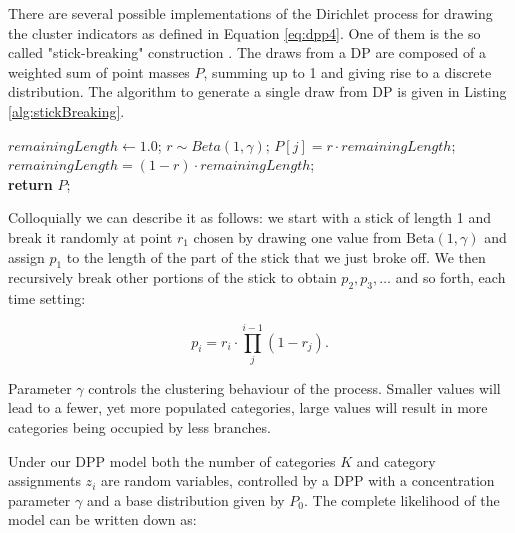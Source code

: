 There are several possible implementations of the Dirichlet process for drawing the cluster indicators as defined in Equation \ref{eq:dpp4}. 
One of them is the so called "stick-breaking" construction \citep{Sethuraman94}.
The draws from a DP are composed of a weighted sum of point masses $P$, summing up to 1 and giving rise to a discrete distribution.
The algorithm to generate a single draw from DP is given in Listing \ref{alg:stickBreaking}.

\begin{algorithm}[H]
\begin{center}
\begin{algorithmic}[1]
%
\State $remainingLength \gets 1.0$;
%
%
\State $r\sim Beta\left(1,\gamma\right)$;
%
\State $P\left[j\right]=r \cdot remainingLength$;
%
\State $remainingLength=\left(1-r\right) \cdot remainingLength$;
%
\EndFor \\
%
 \textbf{return} $P$;
\end{algorithmic}
\end{center}
\caption{ 
{ \footnotesize 
{\bf Constructing the Dirichlet process by stick breaking.} 
}%
}
\label{alg:stickBreaking}
\end{algorithm}

Colloquially we can describe it as follows: we start with a stick of length 1 and break it randomly at point $r_{1}$ chosen by drawing one value from $\text{Beta}(1, \gamma)$ and assign $p_{1}$ to the length of the part of the stick that we just broke off.
We then recursively break other portions of the stick to obtain $p_{2}, p_{3}, \ldots$ and so forth, each time setting:

\begin{equation}
p_{i}=r_{i}\cdot\underset{j}{\overset{i-1}{\prod}}\left(1-r_{j}\right).
\label{eq:sticks}
\end{equation}

\noindent
Parameter $\gamma$ controls the clustering behaviour of the process.
Smaller values will lead to a fewer, yet more populated categories, large values will result in more categories being occupied by less branches.

Under our DPP model both the number of categories $K$ and category assignments $z_{i}$ are random variables, controlled by a DPP with a concentration parameter $\gamma$ and a base distribution given by $P_{0}$.
The complete likelihood of the model can be written down as:

